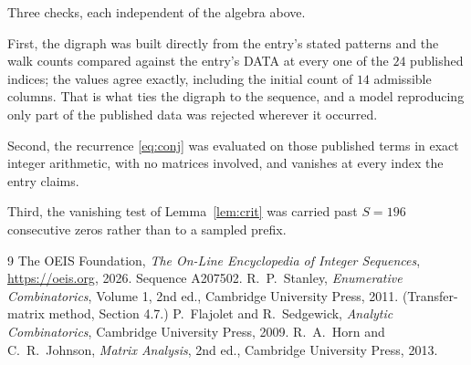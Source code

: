 \documentclass[11pt,a4paper]{article}
\theoremstyle{plain}
\theoremstyle{definition}
\begin{document}
Three checks, each independent of the algebra above.

First, the digraph was built directly from the entry's stated patterns and the walk counts
compared against the entry's DATA at every one of the $24$ published indices; the
values agree exactly, including the initial count of $14$ admissible columns. That is
what ties the digraph to the sequence, and a model reproducing only part of the published
data was rejected wherever it occurred.

Second, the recurrence \eqref{eq:conj} was evaluated on those published terms in exact
integer arithmetic, with no matrices involved, and vanishes at every index the entry claims.

Third, the vanishing test of Lemma~\ref{lem:crit} was carried past $S=196$ consecutive
zeros rather than to a sampled prefix.

\begin{thebibliography}{9}
 The OEIS Foundation, \emph{The On-Line Encyclopedia of Integer
Sequences}, \url{https://oeis.org}, 2026. Sequence A207502.
 R.~P.~Stanley, \emph{Enumerative Combinatorics}, Volume 1, 2nd ed.,
Cambridge University Press, 2011. (Transfer-matrix method, Section 4.7.)
 P.~Flajolet and R.~Sedgewick, \emph{Analytic Combinatorics}, Cambridge
University Press, 2009.
 R.~A.~Horn and C.~R.~Johnson, \emph{Matrix Analysis}, 2nd ed., Cambridge
University Press, 2013.
\end{thebibliography}
\end{document}
